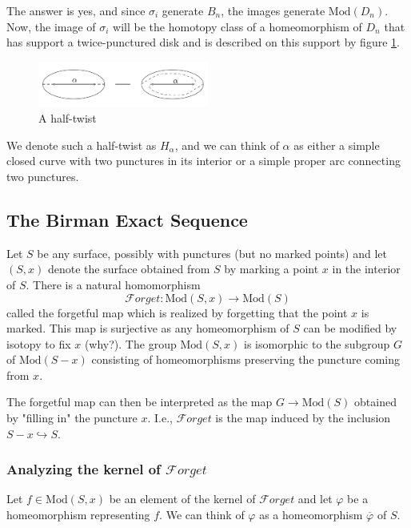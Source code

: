 \documentclass[reqno]{amsart}
\theoremstyle{definition}
\theoremstyle{remark}
\newcommand{\Mod}{{\mathrm{Mod}}}
\newcommand{\Forget}{{\mathcal{F}}orget}
\begin{document}
The answer is yes, and since $\sigma_i$ generate
$B_n$, the images generate $\Mod(D_n)$. Now, the
image of $\sigma_i$ will be the
homotopy class of a homeomorphism
of $D_n$ that has support a twice-punctured disk and is
described on this support by figure \ref{fig:half-twist-png}.

\begin{figure}[htpb]
    \centering
    \includegraphics[width=0.5\textwidth]{half-twist.png}
    \caption{A half-twist}
    \label{fig:half-twist-png}
\end{figure}

We denote such a half-twist as $H_{\alpha}$, and we
can think of $\alpha$ as either a simple closed
curve with two punctures in its interior or a simple
proper arc connecting two punctures.


\subsection{The Birman Exact Sequence}

Let $S$ be any surface, possibly with punctures (but no 
marked points) and let
$\left( S, x \right) $ denote the surface obtained
from $S$ by marking a point $x$ in the
interior of $S$. There is a natural
homomorphism
\[
\Forget \colon \Mod \left( S, x \right) \to \Mod(S)
\] 
called the forgetful map which is realized by forgetting
that the point $x$ is marked. This map is
surjective as any homeomorphism of $S$ can
be modified by isotopy to fix $x$ (why?). The
group $\Mod(S,x)$ is isomorphic to the
subgroup $G$ of $\Mod \left( S - x \right) $ 
consisting of homeomorphisms preserving the
puncture coming from $x$.

The forgetful map can then be interpreted
as the map $G \to \Mod(S)$ obtained by "filling in" the
puncture $x$. I.e., $\Forget$ is the map
induced by the inclusion
 $S -x \hookrightarrow S$.



 

 \subsubsection{Analyzing the kernel of $\Forget$}

 Let $f \in \Mod(S,x)$ be an element of the kernel
 of $\Forget$ and let  $\varphi $ be a homeomorphism
 representing $f$. We can think of
 $\varphi $ as a homeomorphism $\overline{\varphi}$ of
 $S$.
\end{document}
